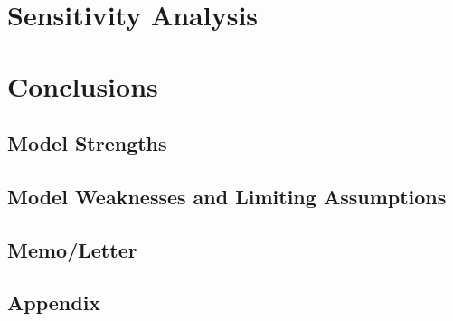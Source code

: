 \documentclass[12pt]{article}
\begin{document}
\section{Sensitivity Analysis}


\section{Conclusions}

\subsection{Model Strengths}

\subsection{Model Weaknesses and Limiting Assumptions}

\newpage
\begin{center}
\section{Memo/Letter}
\end{center}


\newpage
{}
 


\newpage
{}
\begin{appendix}
\section*{Appendix}

\end{appendix}
\end{document}

